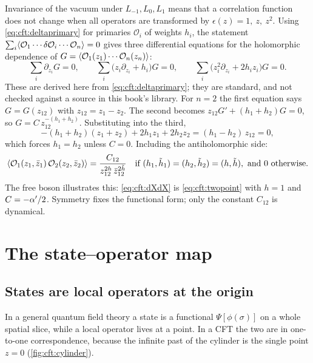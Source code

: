 Invariance of the vacuum under $L_{-1},L_0,L_1$ means that a correlation function does not change
when all operators are transformed by $\epsilon(z)=1,\ z,\ z^2$. Using
\eqref{eq:cft:deltaprimary} for primaries $\mathcal O_i$ of weights $h_i$, the statement
$\sum_i\langle \mathcal O_1\cdots\delta\mathcal O_i\cdots\mathcal O_n\rangle=0$ gives three differential
equations for the holomorphic dependence of $G=\langle \mathcal O_1(z_1)\cdots\mathcal O_n(z_n)\rangle$:
\begin{equation}\label{eq:cft:globalward}
  \sum_i\partial_{z_i}G=0,\qquad
  \sum_i\big(z_i\partial_{z_i}+h_i\big)G=0,\qquad
  \sum_i\big(z_i^2\partial_{z_i}+2h_iz_i\big)G=0 .
\end{equation}
These are derived here from \eqref{eq:cft:deltaprimary}; they are standard, and not checked
against a source in this book's library. For $n=2$ the first equation says $G=G(z_{12})$ with
$z_{12}=z_1-z_2$. The second becomes $z_{12}G'+(h_1+h_2)G=0$, so
$G=C\,z_{12}^{-(h_1+h_2)}$. Substituting into the third,
\[
  -(h_1+h_2)(z_1+z_2)+2h_1z_1+2h_2z_2=(h_1-h_2)\,z_{12}=0 ,
\]
which forces $h_1=h_2$ unless $C=0$. Including the antiholomorphic side:
\begin{equation}\label{eq:cft:twopoint}
  \langle \mathcal O_1(z_1,\bar z_1)\,\mathcal O_2(z_2,\bar z_2)\rangle
  =\frac{C_{12}}{z_{12}^{2h}\,\bar z_{12}^{2\tilde h}}\quad\text{if }(h_1,\tilde h_1)
  =(h_2,\tilde h_2)=(h,\tilde h),\ \text{and }0\text{ otherwise.}
\end{equation}
The free boson illustrates this: \eqref{eq:cft:dXdX} is \eqref{eq:cft:twopoint} with $h=1$ and
$C=-\alpha'/2$. Symmetry fixes the functional form; only the constant $C_{12}$ is dynamical.

\section{The state--operator map}\label{sec:cft:stateop}

\subsection{States are local operators at the origin}

In a general quantum field theory a state is a functional $\Psi[\phi(\sigma)]$ on a whole
spatial slice, while a local operator lives at a point. In a CFT the two are in one-to-one
correspondence, because the infinite past of the cylinder is the single
point $z=0$ (\cref{fig:cft:cylinder}).

